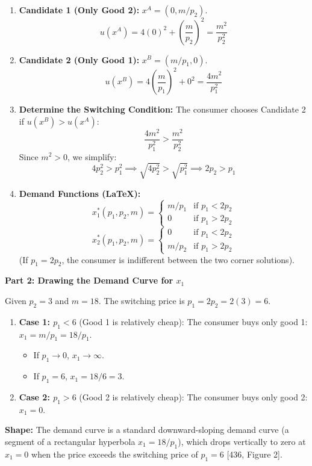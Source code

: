\documentclass{article}
\begin{document}
\begin{enumerate}
\item \textbf{Candidate 1 (Only Good 2):} $x^A = (0, m/p_2)$.
\[ u(x^A) = 4(0)^2 + \left(\frac{m}{p_2}\right)^2 = \frac{m^2}{p_2^2} \]
\item \textbf{Candidate 2 (Only Good 1):} $x^B = (m/p_1, 0)$.
\[ u(x^B) = 4\left(\frac{m}{p_1}\right)^2 + 0^2 = \frac{4m^2}{p_1^2} \]
\item \textbf{Determine the Switching Condition:} The consumer chooses Candidate 2 if $u(x^B) > u(x^A)$:
\[ \frac{4m^2}{p_1^2} > \frac{m^2}{p_2^2} \]
Since $m^2 > 0$, we simplify:
\[ 4p_2^2 > p_1^2 \implies \sqrt{4p_2^2} > \sqrt{p_1^2} \implies 2p_2 > p_1 \]
\item \textbf{Demand Functions (LaTeX):}
\[ x_1^*(p_1, p_2, m) = \begin{cases} m/p_1 & \text{if } p_1 < 2p_2 \\ 0 & \text{if } p_1 > 2p_2 \end{cases} \]
\[ x_2^*(p_1, p_2, m) = \begin{cases} 0 & \text{if } p_1 < 2p_2 \\ m/p_2 & \text{if } p_1 > 2p_2 \end{cases} \]
(If $p_1 = 2p_2$, the consumer is indifferent between the two corner solutions).
\end{enumerate}

\textbf{Part 2: Drawing the Demand Curve for $x_1$}

Given $p_2 = 3$ and $m = 18$. The switching price is $p_1 = 2p_2 = 2(3) = 6$.

\begin{enumerate}
\item \textbf{Case 1: $p_1 < 6$} (Good 1 is relatively cheap): The consumer buys only good 1: $x_1 = m/p_1 = 18/p_1$.
\begin{itemize}
\item If $p_1 \to 0$, $x_1 \to \infty$.
\item If $p_1 = 6$, $x_1 = 18/6 = 3$.
\end{itemize}
\item \textbf{Case 2: $p_1 > 6$} (Good 2 is relatively cheap): The consumer buys only good 2: $x_1 = 0$.
\end{enumerate}

\textbf{Shape:} The demand curve is a standard downward-sloping demand curve (a segment of a rectangular hyperbola $x_1 = 18/p_1$), which drops vertically to zero at $x_1=0$ when the price exceeds the switching price of $p_1=6$ [436, Figure 2].
\end{document}
